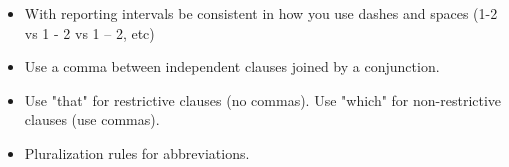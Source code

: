 {\begin{tips}
\begin{itemize}[noitemsep]
\begin{itemize}[noitemsep]
                    \item With reporting intervals be consistent in how you use dashes and spaces (1-2 vs 1 - 2 vs 1 – 2, etc)
                    \item Use a comma between independent clauses joined by a conjunction.
                    \item Use "that" for restrictive clauses (no commas). Use "which" for non-restrictive clauses (use commas). 
                    \item Pluralization rules for abbreviations.
                \end{itemize}
        \end{itemize}
    \end{tips}
    }
    
